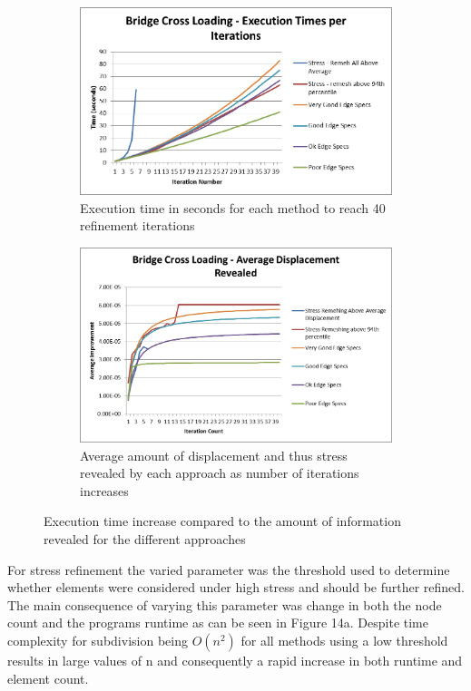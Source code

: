 \begin{figure}[!h]
\centering
\begin{subfigure}{.5\textwidth}
  \centering
  \includegraphics[width=0.9\linewidth]{../Graphics/Graphs/BridgeCrossLoadingExecutionTimesPerIterations.png}
  \caption{Execution time in seconds for each method to reach 40 refinement iterations}
  \label{fig:sub1}
\end{subfigure}%
\begin{subfigure}{.5\textwidth}
  \centering
  \includegraphics[width=0.9\linewidth]{../Graphics/Graphs/BridgeCrossLoadingAverageDisplacementRevealed.png}
  \caption{Average amount of displacement and thus stress revealed by each approach as number of iterations increases}
  \label{fig:sub2}
\end{subfigure}
\label{fig:test}
  \caption{Execution time increase compared to the amount of information revealed for the different approaches}
 \end{figure}

\noindent
For stress refinement the varied parameter was the threshold used to determine whether elements were considered under high stress and should be further refined. The main consequence of varying this parameter was change in both the node count and the programs runtime as can be seen in Figure 14a. Despite time complexity for subdivision being $O(n^2)$ for all methods using a low threshold results in large values of n and consequently a rapid increase in both runtime and element count. \\

